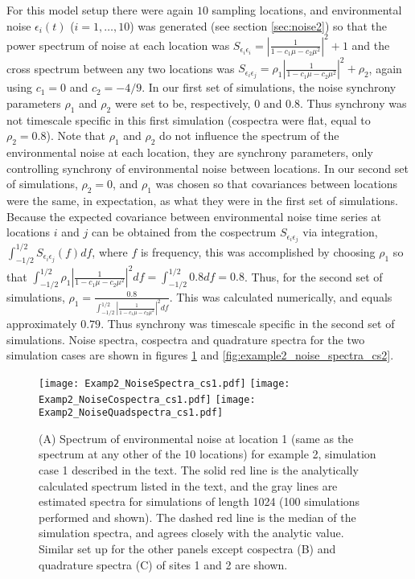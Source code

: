 \documentclass[letterpaper,11pt]{article}
\begin{document}
For this model setup there were again $10$ sampling locations, and environmental noise
$\epsilon_{i}(t)$ ($i=1,\ldots, 10$) was generated (see section \ref{sec:noise2})
so that the power spectrum of noise at each location was 
$S_{\epsilon_{i}\epsilon_{i}} = \left| \frac{1}{1-c_1 \mu -c_2 \mu^2} \right|^{ 2}+1$
and the cross spectrum between any two locations was
$S_{\epsilon_{i}\epsilon_{j}}= \rho_{1}\left| \frac{1}{1-c_1 \mu -c_2 \mu^2} \right|^{ 2}+\rho_2$, again using $c_1=0$ and $c_2=-4/9$. In our first set of simulations,
the noise synchrony parameters $\rho_1$ and $\rho_2$ were set to be,
respectively, $0$ and $0.8$. Thus synchrony was  not timescale specific
in this first simulation (cospectra were flat, equal to $\rho_2=0.8$). 
Note that $\rho_1$ and $\rho_2$
do not influence  the spectrum of the environmental noise  at each location,
they are synchrony parameters,  only controlling synchrony 
of environmental noise between locations. In our second set of simulations,
$\rho_2=0$, and $\rho_1$ was chosen so that covariances between locations
were the same, in expectation, as what they were in the first set of simulations.
Because the expected covariance between environmental noise time series at
locations $i$ and $j$ can be obtained from the cospectrum $S_{\epsilon_{i}\epsilon_{j}}$
via integration, $\int_{-1/2}^{1/2} S_{\epsilon_{i}\epsilon_{j}}(f) df$, 
where $f$ is frequency, this was accomplished by choosing $\rho_1$
so that $\int_{-1/2}^{1/2} \rho_1 \left| \frac{1}{1-c_1 \mu -c_2 \mu^2} \right|^2 df
= \int_{-1/2}^{1/2} 0.8 df = 0.8$. Thus, for the second set of simulations,
$\rho_1 = \frac{0.8}{\int_{-1/2}^{1/2} \left| \frac{1}{1-c_1 \mu -c_2 \mu^2} \right|^2 df}$. This was calculated numerically, and equals approximately $0.79$.
Thus synchrony was timescale specific in the second set of simulations.
Noise spectra, cospectra and quadrature spectra for the two simulation cases
are shown in figures \ref{fig:example2_noise_spectra_cs1} and \ref{fig:example2_noise_spectra_cs2}.

\begin{figure}
\texttt{[image: Examp2\_NoiseSpectra\_cs1.pdf]}
\texttt{[image: Examp2\_NoiseCospectra\_cs1.pdf]}
\texttt{[image: Examp2\_NoiseQuadspectra\_cs1.pdf]}
\caption{(A) Spectrum of environmental noise at location 1 (same as the spectrum at any other of the 10 locations) for example 2, simulation case 1 described in the text. The solid red line is the analytically calculated spectrum listed in the text, and the gray lines are estimated spectra for simulations of length 1024 (100 simulations performed and shown). The dashed red line is the median of the simulation spectra, and agrees closely with the analytic value. Similar set up for the other panels except cospectra (B) and quadrature spectra (C) of sites 1 and 2 are shown.}\label{fig:example2_noise_spectra_cs1}
\end{figure}
\end{document}
